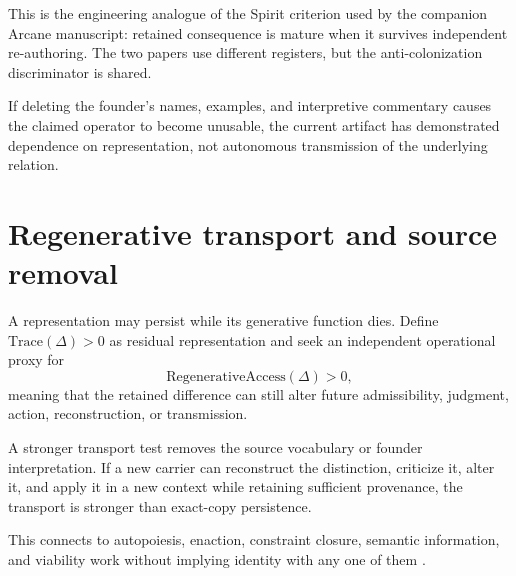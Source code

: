 This is the engineering analogue of the Spirit criterion used by the companion Arcane manuscript: retained consequence is mature when it survives independent re-authoring. The two papers use different registers, but the anti-colonization discriminator is shared.

\begin{criterion}
If deleting the founder's names, examples, and interpretive commentary causes the claimed operator to become unusable, the current artifact has demonstrated dependence on representation, not autonomous transmission of the underlying relation.
\end{criterion}

\section{Regenerative transport and source removal}

A representation may persist while its generative function dies. Define $\mathrm{Trace}(\Delta)>0$ as residual representation and seek an independent operational proxy for
\begin{equation}
\mathrm{RegenerativeAccess}(\Delta)>0,
\end{equation}
meaning that the retained difference can still alter future admissibility, judgment, action, reconstruction, or transmission.

A stronger transport test removes the source vocabulary or founder interpretation. If a new carrier can reconstruct the distinction, criticize it, alter it, and apply it in a new context while retaining sufficient provenance, the transport is stronger than exact-copy persistence.

This connects to autopoiesis, enaction, constraint closure, semantic information, and viability work without implying identity with any one of them \cite{MaturanaVarela1980,MorenoMossio2015,KolchinskyWolpert2018,GarciaDeacon2024}.
